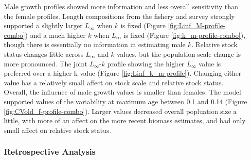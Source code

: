 \documentclass[11pt,
  english,
  a4paper,
]{article}
\begin{document}
\leavevmode\tagmcend\tagstructend\par


Male growth profiles showed more information and less overall sensitivity than the female profiles. Length compositions from the fishery and survey strongly supported a slightly larger {\(L_{\infty}\)\leavevmode\tagmcend\tagstructend} when {\(k\)\leavevmode\tagmcend\tagstructend} is fixed (Figure \ref{fig:Linf_M-profile-combo}) and a much higher {\(k\)\leavevmode\tagmcend\tagstructend} when {\(L_{\infty}\)\leavevmode\tagmcend\tagstructend} is fixed (Figure \ref{fig:k_m-profile-combo}), though there is essentially no information in estimating male {\(k\)\leavevmode\tagmcend\tagstructend}. Relative stock status changes little across {\(L_{\infty}\)\leavevmode\tagmcend\tagstructend} and {\(k\)\leavevmode\tagmcend\tagstructend} values, but the population scale change is more pronounced. The joint {\(L_{\infty}\)\leavevmode\tagmcend\tagstructend}-{\(k\)\leavevmode\tagmcend\tagstructend} profile showing the higher {\(L_{\infty}\)\leavevmode\tagmcend\tagstructend} value is preferred over a higher k value (Figure \ref{fig:Linf_k_m-profile}). Changing either value has a relatively small affect on stock scale and relative stock status. Overall, the influence of male growth values is smaller than females. The model supported values of the variability at maximum age between 0.1 and 0.14 (Figure \ref{fig:CVold_f-profile-combo}). Larger values decreased overall popluation size a little, with more of an affect on the more recent biomass estimates, and had only small affect on relative stock status.

\leavevmode\tagmcend\tagstructend\par


\hypertarget{retrospective-analysis}{%
\subsubsection{Retrospective Analysis}\label{retrospective-analysis}}
\end{document}
